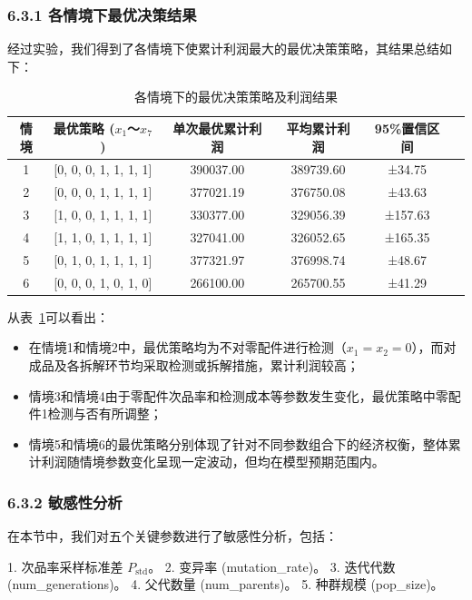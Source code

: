 \documentclass{article}
\begin{document}
	\subsubsection*{6.3.1 各情境下最优决策结果}
	
	经过实验，我们得到了各情境下使累计利润最大的最优决策策略，其结果总结如下：
	
	\begin{table}[H]
		\centering
		\caption{各情境下的最优决策策略及利润结果}
		\label{tab:optimal}
		\begin{tabular}{cccccc}
			\hline
			情境 & 最优策略 ($x_1$～$x_7$) & 单次最优累计利润 & 平均累计利润 & 95\%置信区间 \\
			\hline
			1 & [0, 0, 0, 1, 1, 1, 1] & 390037.00 & 389739.60 & ±34.75 \\
			2 & [0, 0, 0, 1, 1, 1, 1] & 377021.19 & 376750.08 & ±43.63 \\
			3 & [1, 0, 0, 1, 1, 1, 1] & 330377.00 & 329056.39 & ±157.63 \\
			4 & [1, 1, 0, 1, 1, 1, 1] & 327041.00 & 326052.65 & ±165.35 \\
			5 & [0, 1, 0, 1, 1, 1, 1] & 377321.97 & 376998.74 & ±48.67 \\
			6 & [0, 0, 0, 1, 0, 1, 0] & 266100.00 & 265700.55 & ±41.29 \\
			\hline
		\end{tabular}
	\end{table}
	
	
	从表~\ref{tab:optimal}可以看出：
	\begin{itemize}
		\item 在情境1和情境2中，最优策略均为不对零配件进行检测（$x_1=x_2=0$），而对成品及各拆解环节均采取检测或拆解措施，累计利润较高；
		\item 情境3和情境4由于零配件次品率和检测成本等参数发生变化，最优策略中零配件1检测与否有所调整；
		\item 情境5和情境6的最优策略分别体现了针对不同参数组合下的经济权衡，整体累计利润随情境参数变化呈现一定波动，但均在模型预期范围内。
	\end{itemize}
	
	\subsubsection*{6.3.2 敏感性分析}
	
	在本节中，我们对五个关键参数进行了敏感性分析，包括：
	
	1. 次品率采样标准差 $P_{\text{std}}$。
	2. 变异率 (mutation\_rate)。
	3. 迭代代数 (num\_generations)。
	4. 父代数量 (num\_parents)。
	5. 种群规模 (pop\_size)。
	
\end{document}
